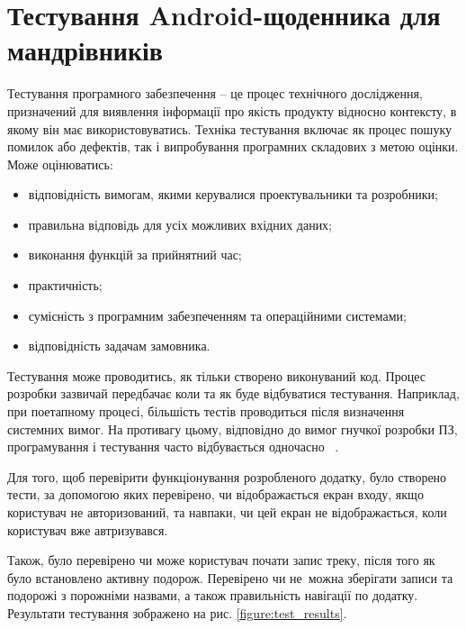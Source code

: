 \documentclass[../main.tex]{subfiles}
\begin{document}

\section{Тестування Android-щоденника для мандрівників}

Тестування програмного забезпечення -- це процес технічного дослідження, призначений для виявлення інформації про якість продукту відносно контексту, в якому він має використовуватись. Техніка тестування включає як процес пошуку помилок або дефектів, так і випробування програмних складових з метою оцінки. Може оцінюватись:

\begin{itemize}[label={--}]
	\item відповідність вимогам, якими керувалися проектувальники та розробники;
	\item правильна відповідь для усіх можливих вхідних даних;
	\item виконання функцій за прийнятний час;
	\item практичність;
	\item сумісність з програмним забезпеченням та операційними системами;
	\item відповідність задачам замовника.
\end{itemize}

Тестування може проводитись, як тільки створено виконуваний код. Процес розробки зазвичай передбачає коли та як буде відбуватися тестування. Наприклад, при поетапному процесі, більшість тестів проводиться після визначення системних вимог. На противагу цьому, відповідно до вимог гнучкої розробки ПЗ, програмування і тестування часто відбувається одночасно~\cite{testing} .

Для того, щоб перевірити функціонування розробленого додатку, було створено тести, за допомогою яких перевірено, чи відображається екран входу, якщо користувач не авторизований, та навпаки, чи цей екран не відображається, коли користувач вже автризувався. 

Також, було перевірено чи може користувач почати запис треку, після того як було встановлено активну подорож. Перевірено чи не~можна зберігати записи та подорожі з порожніми назвами, а також правильність навігації по додатку. Результати тестування зображено на рис. \ref{figure:test_results}.
\end{document}
